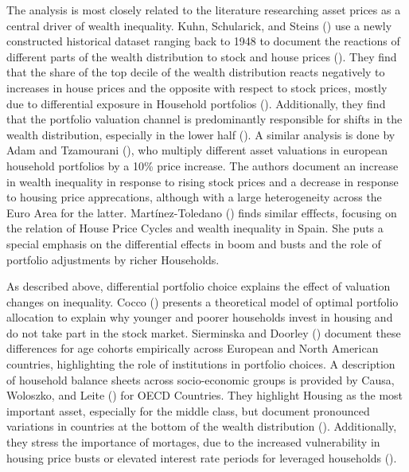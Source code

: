 \documentclass[
  a4paper,
  DIV=11,
  numbers=noendperiod]{scrartcl}
\begin{document}
The analysis is most closely related to the literature researching asset
prices as a central driver of wealth inequality. Kuhn, Schularick, and
Steins () use a newly
constructed historical dataset ranging back to 1948 to document the
reactions of different parts of the wealth distribution to stock and
house prices ().
They find that the share of the top decile of the wealth distribution
reacts negatively to increases in house prices and the opposite with
respect to stock prices, mostly due to differential exposure in
Household portfolios
(). Additionally,
they find that the portfolio valuation channel is predominantly
responsible for shifts in the wealth distribution, especially in the
lower half (). A
similar analysis is done by Adam and Tzamourani
(), who
multiply different asset valuations in european household portfolios by
a 10\% price increase. The authors document an increase in wealth
inequality in response to rising stock prices and a decrease in response
to housing price apprecations, although with a large heterogeneity
across the Euro Area for the latter. Martínez-Toledano
() finds
similar efffects, focusing on the relation of House Price Cycles and
wealth inequality in Spain. She puts a special emphasis on the
differential effects in boom and busts and the role of portfolio
adjustments by richer Households.

As described above, differential portfolio choice explains the effect of
valuation changes on inequality. Cocco
() presents a
theoretical model of optimal portfolio allocation to explain why younger
and poorer households invest in housing and do not take part in the
stock market. Sierminska and Doorley
() document these
differences for age cohorts empirically across European and North
American countries, highlighting the role of institutions in portfolio
choices. A description of household balance sheets across socio-economic
groups is provided by Causa, Woloszko, and Leite
() for OECD
Countries. They highlight Housing as the most important asset,
especially for the middle class, but document pronounced variations in
countries at the bottom of the wealth distribution
().
Additionally, they stress the importance of mortages, due to the
increased vulnerability in housing price busts or elevated interest rate
periods for leveraged households
().
\end{document}
